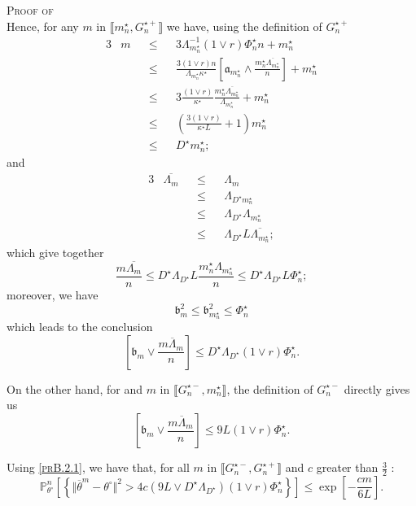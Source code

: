 \begin{pro}{\textsc{Proof of } \\}
Hence, for any $m$ in $\llbracket m_{n}^{\star}, G_{n}^{\star+} \rrbracket$ we have, using the definition of $G_{n}^{\star +}$
\begin{alignat*}{3}
& m && \leq && 3 \Lambda_{m_{n}^{\star}}^{-1} (1 \vee r) \Phi_{n}^{\star} n + m_{n}^{\star}\\
& && \leq && \frac{3 (1 \vee r) n}{\Lambda_{m_{n}^{\star}} \kappa^{\star}} \left[\mathfrak{a}_{m_{n}^{\star}} \wedge \frac{m_{n}^{\star} \overline{\Lambda_{m_{n}^{\star}}}}{n}\right] + m_{n}^{\star}\\
& && \leq && 3 \frac{(1 \vee r)}{\kappa^{\star}} \frac{m_{n}^{\star} \overline{\Lambda_{m_{n}^{\star}}}}{\Lambda_{m_{n}^{\star}}} + m_{n}^{\star}\\
& && \leq && \left( \frac{3 (1 \vee r)}{\kappa^{\star} L} + 1\right) m_{n}^{\star}\\
& && \leq && D^{\star} m_{n}^{\star};
\end{alignat*}
and 
\begin{alignat*}{3}
& \overline{\Lambda_{m}} && \leq && \Lambda_{m}\\
& && \leq && \Lambda_{D^{\star} m_{n}^{\star}}\\
& && \leq && \Lambda_{D^{\star}} \Lambda_{m_{n}^{\star}}\\
& && \leq && \Lambda_{D^{\star}} L \overline{\Lambda_{m_{n}^{\star}}};
\end{alignat*}
which give together
\[\frac{m \overline{\Lambda_{m}}}{n} \leq D^{\star} \Lambda_{D^{\star}} L \frac{m_{n}^{\star} \Lambda_{m_{n}^{\star}}}{n} \leq D^{\star} \Lambda_{D^{\star}} L \Phi_{n}^{\star};\]
moreover, we have
\[\mathfrak{b}_{m}^{2} \leq \mathfrak{b}_{m_{n}^{\star}}^{2} \leq \Phi_{n}^{\star}\]
which leads to the conclusion
\[\left[\mathfrak{b}_{m} \vee \frac{m \overline{\Lambda}_{m}}{n}\right] \leq D^{\star} \Lambda_{D^{\star}} \left( 1 \vee r\right) \Phi_{n}^{\star}.\]

On the other hand, for and $m$ in $\llbracket G_{n}^{\star -}, m_{n}^{\star} \rrbracket$, the definition of $G_{n}^{\star -}$ directly gives us
\[\left[\mathfrak{b}_{m} \vee \frac{m \overline{\Lambda}_{m}}{n}\right] \leq 9 L \left(1 \vee r\right) \Phi_{n}^{\star}.\]

Using \textsc{\cref{prB.2.1}}, we have that, for all $m$ in $\llbracket G_{n}^{\star-}, G_{n}^{\star+} \rrbracket$ and $c$ greater than $\frac{3}{2}$ :
\[\mathds{P}_{\theta^{\circ}}^{n}\left[\left\{\Vert \overline{\theta}^{m} - \theta^{\circ}\Vert^{2} > 4c \left(9 L \vee D^{\star} \Lambda_{D^{\star}}\right) \left(1 \vee r\right) \Phi_{n}^{\star}\right\}\right] \leq \exp\left[-\frac{c m}{6 L}\right].\]


\end{pro}
